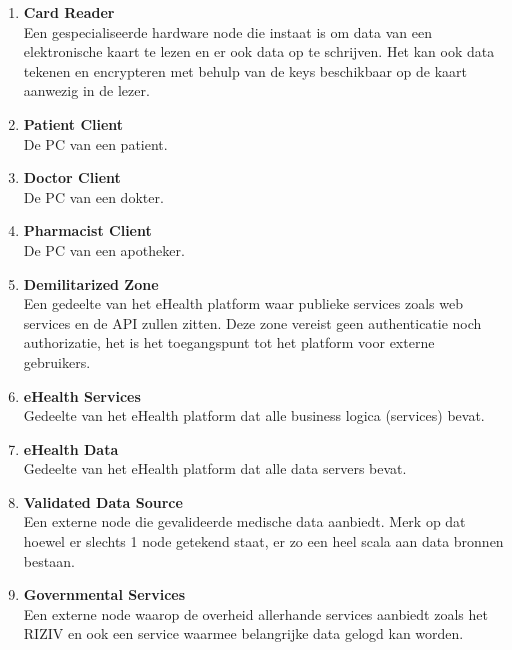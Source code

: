 \documentclass[a4paper,10pt]{paper}
\begin{document}
\begin{enumerate}
\item \textbf{Card Reader}\\
Een gespecialiseerde hardware node die instaat is om data van een elektronische kaart
te lezen en er ook data op te schrijven. Het kan ook data tekenen en encrypteren met
behulp van de keys beschikbaar op de kaart aanwezig in de lezer.
\item \textbf{Patient Client}\\
De PC van een patient.
\item \textbf{Doctor Client}\\
De PC van een dokter.
\item \textbf{Pharmacist Client}\\
De PC van een apotheker.
\item \textbf{Demilitarized Zone}\\
Een gedeelte van het eHealth platform waar publieke services zoals web services en
de API zullen zitten. Deze zone vereist geen authenticatie noch authorizatie, het 
is het toegangspunt tot het platform voor externe gebruikers.
\item \textbf{eHealth Services}\\
Gedeelte van het eHealth platform dat alle business logica (services) bevat.
\item \textbf{eHealth Data}\\
Gedeelte van het eHealth platform dat alle data servers bevat.
\item \textbf{Validated Data Source}\\
Een externe node die gevalideerde medische data aanbiedt. Merk op dat hoewel er slechts 1 node
getekend staat, er zo een heel scala aan data bronnen bestaan.
\item \textbf{Governmental Services}\\
Een externe node waarop de overheid allerhande services aanbiedt zoals het RIZIV en ook een
service waarmee belangrijke data gelogd kan worden.
\end{enumerate}
\end{document}
